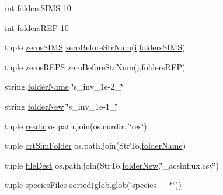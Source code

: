 \begin{DoxyCompactItemize}
\item 
int \hyperlink{namespacereset_for_new_simulations_a60b4005683b2bced2f3e0b22a66abd47}{folders\-S\-I\-M\-S} 10
\item 
int \hyperlink{namespacereset_for_new_simulations_a3869e711bac998c005313abd611c6158}{folders\-R\-E\-P} 10
\item 
tuple \hyperlink{namespacereset_for_new_simulations_a067f416fc59f243e38a0b8a40627979b}{zeros\-S\-I\-M\-S} \hyperlink{namespacereset_for_new_simulations_aba1c55fe18d1a0b31b346994a7a96628}{zero\-Before\-Str\-Num}(\hyperlink{start_8m_ad3efca1ea6e3333daf30719ee0501862}{i},\hyperlink{namespacereset_for_new_simulations_a60b4005683b2bced2f3e0b22a66abd47}{folders\-S\-I\-M\-S})
\item 
tuple \hyperlink{namespacereset_for_new_simulations_a9f88ef39633f68b28f6b0e96d5ebb34c}{zeros\-R\-E\-P\-S} \hyperlink{namespacereset_for_new_simulations_aba1c55fe18d1a0b31b346994a7a96628}{zero\-Before\-Str\-Num}(\hyperlink{inizializzatore___a_c_s_8m_ac86694252f8dfdb19aaeadc4b7c342c6}{j},\hyperlink{namespacereset_for_new_simulations_a3869e711bac998c005313abd611c6158}{folders\-R\-E\-P})
\item 
string \hyperlink{namespacereset_for_new_simulations_af9fbda1c8e6d13404f0224a5b3ef16fe}{folder\-Name} \char`\"{}s\-\_\-inv\-\_\-1e-\/2\-\_\-\char`\"{}
\item 
string \hyperlink{namespacereset_for_new_simulations_adfad2b3e8459d644a442c254865c564b}{folder\-New} \char`\"{}s\-\_\-inv\-\_\-1e-\/1\-\_\-\char`\"{}
\item 
tuple \hyperlink{namespacereset_for_new_simulations_addd72b08bf24570a2a851808a0b21949}{resdir} os.\-path.\-join(os.\-curdir, \char`\"{}res\char`\"{})
\item 
tuple \hyperlink{namespacereset_for_new_simulations_ad71f20889e7a6394d3c15e5e9381394d}{crt\-Sim\-Folder} os.\-path.\-join(Str\-To,\hyperlink{namespacereset_for_new_simulations_af9fbda1c8e6d13404f0224a5b3ef16fe}{folder\-Name})
\item 
tuple \hyperlink{namespacereset_for_new_simulations_a0fd24d58ef8ebf1029176f620ce7fe65}{file\-Dest} os.\-path.\-join(Str\-To,\hyperlink{namespacereset_for_new_simulations_adfad2b3e8459d644a442c254865c564b}{folder\-New},\char`\"{}\-\_\-acsinflux.\-csv\char`\"{})
\item 
tuple \hyperlink{namespacereset_for_new_simulations_a876ddf603699b40992ad784167b1121e}{species\-Files} sorted(glob.\-glob(\char`\"{}species\-\_\-\_\-$\ast$\char`\"{}))

\end{DoxyCompactItemize}
